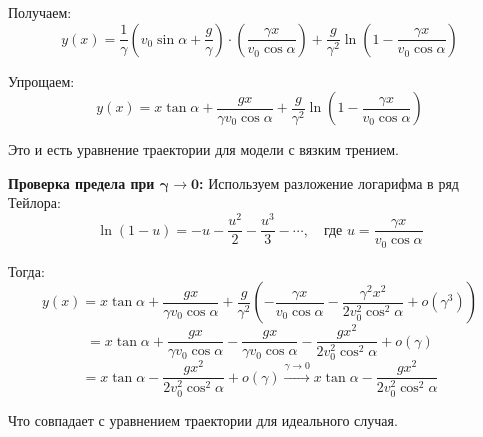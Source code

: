 Получаем:
\[
y(x) = \dfrac{1}{\gamma}\left(v_0 \sin\alpha + \dfrac{g}{\gamma}\right)\cdot \left(\dfrac{\gamma x}{v_0 \cos\alpha}\right) + \dfrac{g}{\gamma^2} \ln\left(1 - \dfrac{\gamma x}{v_0 \cos\alpha}\right)
\]

Упрощаем:
\[
y(x) = x \tan\alpha + \dfrac{g x}{\gamma v_0 \cos\alpha} + \dfrac{g}{\gamma^2} \ln\left(1 - \dfrac{\gamma x}{v_0 \cos\alpha}\right)
\]

Это и есть уравнение траектории для модели с вязким трением.

\textbf{Проверка предела при $\bm{\gamma \to 0}$:}
Используем разложение логарифма в ряд Тейлора:
\[
\ln(1 - u) = -u - \dfrac{u^2}{2} - \dfrac{u^3}{3} - \cdots, \quad \text{где } u = \dfrac{\gamma x}{v_0 \cos\alpha}
\]

Тогда:
\[
y(x) = x \tan\alpha + \dfrac{g x}{\gamma v_0 \cos\alpha} + \dfrac{g}{\gamma^2} \left(-\dfrac{\gamma x}{v_0 \cos\alpha} - \dfrac{\gamma^2 x^2}{2v_0^2 \cos^2\alpha} + o(\gamma^3)\right)
\]
\[
= x \tan\alpha + \dfrac{g x}{\gamma v_0 \cos\alpha} - \dfrac{g x}{\gamma v_0 \cos\alpha} - \dfrac{g x^2}{2v_0^2 \cos^2\alpha} + o(\gamma)
\]
\[
= x \tan\alpha - \dfrac{g x^2}{2v_0^2 \cos^2\alpha} + o(\gamma) \xrightarrow{\gamma \to 0} x \tan\alpha - \dfrac{g x^2}{2v_0^2 \cos^2\alpha}
\]

Что совпадает с уравнением траектории для идеального случая.